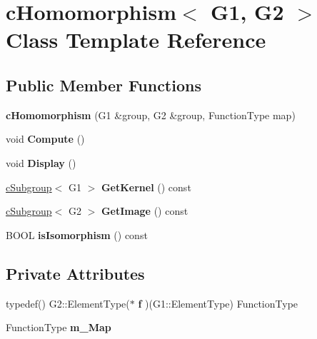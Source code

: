 \hypertarget{classcHomomorphism}{\section{c\-Homomorphism$<$ \-G1, \-G2 $>$ \-Class \-Template \-Reference}
\label{classcHomomorphism}
}
\subsection*{\-Public \-Member \-Functions}
\begin{DoxyCompactItemize}
\item 
\hypertarget{classcHomomorphism_a826f07eaa6c431de9fc8ad236ebb7502}{{\bfseries c\-Homomorphism} (\-G1 \&group, \-G2 \&group, \-Function\-Type map)}\label{classcHomomorphism_a826f07eaa6c431de9fc8ad236ebb7502}

\item 
\hypertarget{classcHomomorphism_a4f6919efcd1c8446207a5150e3f29143}{void {\bfseries \-Compute} ()}\label{classcHomomorphism_a4f6919efcd1c8446207a5150e3f29143}

\item 
\hypertarget{classcHomomorphism_a0afe7b713cdb3e7628d049011334b539}{void {\bfseries \-Display} ()}\label{classcHomomorphism_a0afe7b713cdb3e7628d049011334b539}

\item 
\hypertarget{classcHomomorphism_a0f6fe4c7df91a345cd26023cf9b7c29d}{\hyperlink{classcSubgroup}{c\-Subgroup}$<$ \-G1 $>$ {\bfseries \-Get\-Kernel} () const }\label{classcHomomorphism_a0f6fe4c7df91a345cd26023cf9b7c29d}

\item 
\hypertarget{classcHomomorphism_ae2a5c5ab1fea57af03dbb926b05c5edc}{\hyperlink{classcSubgroup}{c\-Subgroup}$<$ \-G2 $>$ {\bfseries \-Get\-Image} () const }\label{classcHomomorphism_ae2a5c5ab1fea57af03dbb926b05c5edc}

\item 
\hypertarget{classcHomomorphism_ae5514786d9d5f0a185e5465c11075f13}{\-B\-O\-O\-L {\bfseries is\-Isomorphism} () const }\label{classcHomomorphism_ae5514786d9d5f0a185e5465c11075f13}

\end{DoxyCompactItemize}
\subsection*{\-Private \-Attributes}
\begin{DoxyCompactItemize}
\item 
\hypertarget{classcHomomorphism_a8b597c591cbbfb2a6ed415978c95d953}{typedef() \-G2\-::\-Element\-Type($\ast$ {\bfseries f} )(\-G1\-::\-Element\-Type) \-Function\-Type}\label{classcHomomorphism_a8b597c591cbbfb2a6ed415978c95d953}

\item 
\hypertarget{classcHomomorphism_ae6f45d109f0163c4ad74e5c30bcfe12c}{\-Function\-Type {\bfseries m\-\_\-\-Map}}\label{classcHomomorphism_ae6f45d109f0163c4ad74e5c30bcfe12c}

\end{DoxyCompactItemize}
